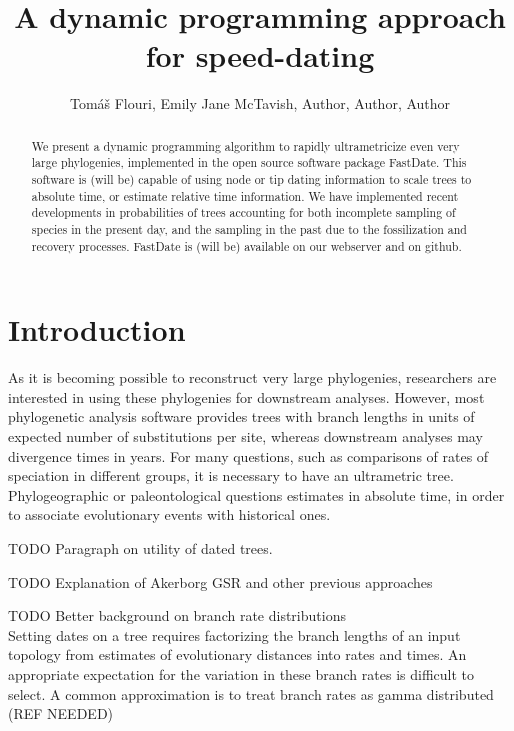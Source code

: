 \documentclass{llncs}
\newcommand{\ejmcomment}[1]{{\color{green} #1}}
\begin{document}
\title{A dynamic programming approach for speed-dating}


\author{Tom\'{a}\v{s} Flouri, Emily Jane McTavish, Author, Author, Author}

\maketitle
\begin{abstract} We present a dynamic programming algorithm to rapidly
ultrametricize even very large phylogenies, implemented in the open source software package FastDate. 
This software is \ejmcomment{(will be)} capable of using node or tip dating information to scale trees to absolute time,
or estimate relative time information.
We have implemented recent developments in probabilities of trees accounting for both incomplete 
sampling of species in the present day, and the sampling in the past due to the fossilization and recovery processes.
FastDate is \ejmcomment{(will be)} available on our webserver and on github.
\end{abstract}


\section{Introduction}
As it is becoming possible to reconstruct very large phylogenies, 
researchers are interested in using these phylogenies for downstream analyses.
However, most phylogenetic analysis software provides trees with branch lengths in units of expected number of substitutions per site,
whereas downstream analyses may divergence times in years.
For many questions, such as comparisons of rates of speciation in different groups, it is necessary to have an ultrametric tree.
Phylogeographic or paleontological questions estimates in absolute time,
in order to associate evolutionary events with historical ones.

TODO Paragraph on utility of dated trees.

TODO Explanation of Akerborg GSR and other previous approaches
 \cite{Akerborg2008}

TODO Better background on branch rate distributions\\
Setting dates on a tree requires factorizing the branch lengths of an input topology
from estimates of evolutionary distances into rates and times. 
An appropriate expectation for the variation in these branch rates is difficult to select.
A common approximation is to treat branch rates as gamma distributed (REF NEEDED)
\end{document}
